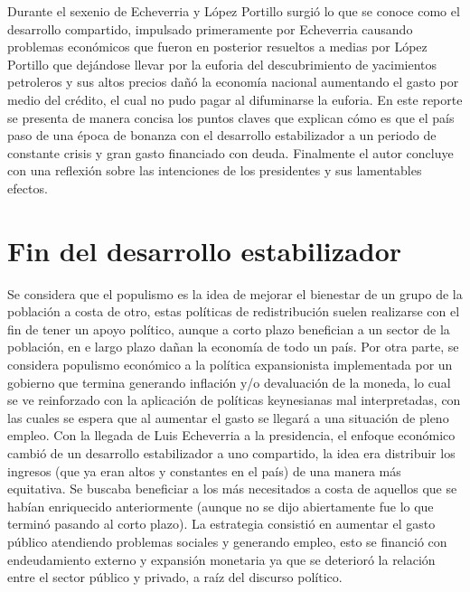 
Durante el sexenio de Echeverria y López Portillo surgió lo que se conoce como el desarrollo compartido, impulsado primeramente por Echeverria causando problemas económicos que fueron en posterior resueltos a medias por López Portillo que dejándose llevar por la euforia del descubrimiento de yacimientos petroleros y sus altos precios dañó la economía nacional aumentando el gasto por medio del crédito, el cual no pudo pagar al difuminarse la euforia.
En este reporte se presenta de manera concisa los puntos claves que explican cómo es que el país paso de una época de bonanza con el desarrollo estabilizador a un periodo de constante crisis y gran gasto financiado con deuda. Finalmente el autor concluye con una reflexión sobre las intenciones de los presidentes y sus lamentables efectos.

\section{Fin del desarrollo estabilizador}
Se considera que el populismo es la idea de mejorar el bienestar de un grupo de la población a costa de otro, estas políticas de redistribución suelen realizarse con el fin de tener un apoyo político, aunque a corto plazo benefician a un sector de la población, en e largo plazo dañan la economía de todo un país. Por otra parte, se considera populismo económico a la política expansionista implementada por un gobierno que termina generando inflación y/o devaluación de la moneda, lo cual se ve reinforzado con la aplicación de políticas keynesianas mal interpretadas, con las cuales se espera que al aumentar el gasto se llegará a una situación de pleno empleo.
Con la llegada de Luis Echeverria a la presidencia, el enfoque económico cambió de un desarrollo estabilizador a uno compartido, la idea era distribuir los ingresos (que ya eran altos y constantes en el país) de una manera más equitativa. Se buscaba beneficiar a los más necesitados a costa de aquellos que se habían enriquecido anteriormente (aunque no se dijo abiertamente fue lo que terminó pasando al corto plazo).
La estrategia consistió en aumentar el gasto público atendiendo problemas sociales y generando empleo, esto se financió con endeudamiento externo y expansión monetaria ya que se deterioró la relación entre el sector público y privado, a raíz del discurso político.

